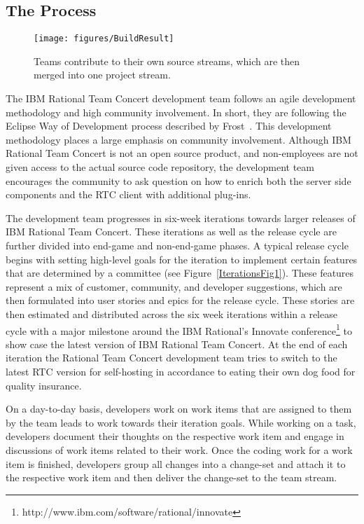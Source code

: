 \subsection{The Process}
\begin{figure}[t]
\begin{center}
\texttt{[image: figures/BuildResult]}
\caption{Teams contribute to their own source streams, which are then merged into one project stream.}
\label{fig:buildresult1}
\end{center}
\end{figure}



The IBM Rational Team Concert development team follows an agile development methodology and high community involvement.
In short, they are following the Eclipse Way of Development process described by Frost~\cite{frost:ieeesoftware:2007}.
This development methodology places a large emphasis on community involvement.
Although IBM Rational Team Concert is not an open source product, and non-employees are not given access to the actual source code repository, the development team encourages the community to ask question on how to enrich both the server side components and the RTC client with additional plug-ins.

The development team progresses in six-week iterations towards larger releases of IBM Rational Team Concert.
These iterations as well as the release cycle are further divided into end-game and non-end-game phases.
A typical release cycle begins with setting high-level goals for the iteration to implement certain features that are determined by a committee (see Figure~\ref{IterationsFig1}).
These features represent a mix of customer, community, and developer suggestions, which are then formulated into user stories and epics for the release cycle.
These stories are then estimated and distributed across the six week iterations within a release cycle with a major milestone around the IBM Rational's Innovate conference\footnote{http://www.ibm.com/software/rational/innovate} to show case the latest version of IBM Rational Team Concert. 
At the end of each iteration the Rational Team Concert development team tries to switch to the latest RTC version for self-hosting in accordance to eating their own dog food for quality insurance.

On a day-to-day basis, developers work on work items that are assigned to them by the team leads to work towards their iteration goals.
While working on a task, developers document their thoughts on the respective work item and engage in discussions of work items related to their work.
Once the coding work for a work item is finished, developers group all changes into a change-set and attach it to the respective work item and then deliver the change-set to the team stream.

